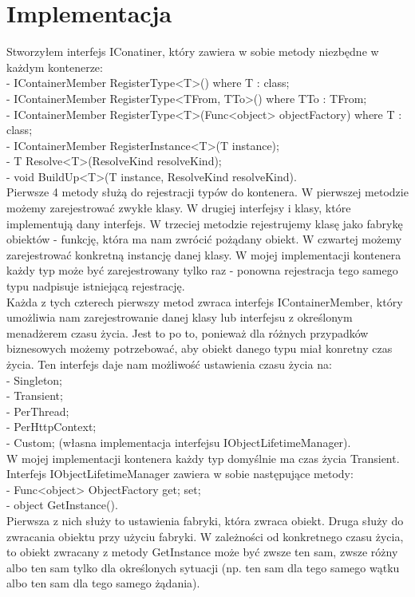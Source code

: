 \documentclass[12pt]{article}
\begin{document}
\section{Implementacja}
Stworzyłem interfejs IConatiner, który zawiera w sobie metody niezbędne w każdym kontenerze:\\
- IContainerMember RegisterType<T>() where T : class;\\
- IContainerMember RegisterType<TFrom, TTo>() where TTo : TFrom;\\
- IContainerMember RegisterType<T>(Func<object> objectFactory) where T : class;\\
- IContainerMember RegisterInstance<T>(T instance);\\
- T Resolve<T>(ResolveKind resolveKind);\\
- void BuildUp<T>(T instance, ResolveKind resolveKind).\\
Pierwsze 4 metody służą do rejestracji typów do kontenera. W pierwszej metodzie możemy zarejestrować zwykłe klasy. W drugiej interfejsy i klasy, które implementują dany interfejs. W trzeciej metodzie rejestrujemy klasę jako fabrykę obiektów - funkcję, która ma nam zwrócić pożądany obiekt. W czwartej możemy zarejestrować konkretną instancję danej klasy. W mojej implementacji kontenera każdy typ może być zarejestrowany tylko raz - ponowna rejestracja tego samego typu nadpisuje istniejącą rejestrację.\\
Każda z tych czterech pierwszy metod zwraca interfejs IContainerMember, który umożliwia nam zarejestrowanie danej klasy lub interfejsu z określonym menadżerem czasu życia. Jest to po to, ponieważ dla różnych przypadków biznesowych możemy potrzebować, aby obiekt danego typu miał konretny czas życia. Ten interfejs daje nam możliwość ustawienia czasu życia na:\\
- Singleton;\\
- Transient;\\
- PerThread;\\
- PerHttpContext;\\
- Custom; (własna implementacja interfejsu IObjectLifetimeManager).\\
W mojej implementacji kontenera każdy typ domyślnie ma czas życia Transient.\\
Interfejs IObjectLifetimeManager zawiera w sobie następujące metody:\\
- Func<object> ObjectFactory { get; set; }\\
- object GetInstance().\\
Pierwsza z nich służy to ustawienia fabryki, która zwraca obiekt. Druga służy do zwracania obiektu przy użyciu fabryki. W zależności od konkretnego czasu życia, to obiekt zwracany z metody GetInstance może być zwsze ten sam, zwsze różny albo ten sam tylko dla określonych sytuacji (np. ten sam dla tego samego wątku albo ten sam dla tego samego żądania).\\ \\
\end{document}
